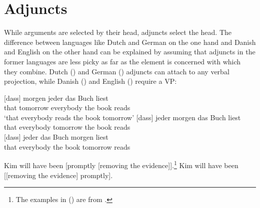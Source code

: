 



\section{Adjuncts}

While arguments are selected by their head, adjuncts select the head. The difference between
languages like Dutch and German on the one hand and Danish and English on the other hand can be
explained by assuming that adjuncts in the former languages are less picky as far as the element is
concerned with which they combine. Dutch () and German ()
adjuncts can attach to any verbal projection, while Danish () and English () require a VP:
\eal
\ex \dutch
\ex
\zl

\eal
\ex
\label{ex-m-j-b-l} 
\gll {}[dass] morgen jeder das Buch liest\\
     \spacebr{}that tomorrow everybody the book reads\\\german
\glt `that everybody reads the book tomorrow'
\ex
\label{ex-j-m-b-l} 
\gll {}[dass] jeder morgen das Buch liest\\
     \spacebr{}that everybody tomorrow the book reads\\ 
\ex
\label{ex-j-b-m-l}
\gll {}[dass] jeder das Buch morgen liest\\
    \spacebr{}that everybody the book tomorrow reads\\
\zl


\eal
\ex \danish
\ex
\zl

\eal
\ex Kim will have been [promptly [removing the evidence]].\footnote{
  The examples in () are from .}
\ex Kim will have been [[removing the evidence] promptly].
\zl

